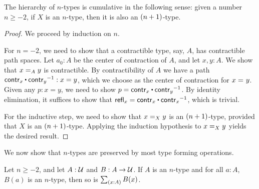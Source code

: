 \begin{thm}\label{thm:hlevel-cumulative}
 The hierarchy of $n$-types is cumulative in the following sense:
   given a number $n \geq -2$, if $X$ is an $n$-type, then it is also an $\nplusone$-type.
\end{thm}

\begin{proof}
 We proceed by induction on $n$.

 For $n = -2$, we need to show that a contractible type, say, $A$, has contractible path spaces.
       Let $a_0: A$ be the center of contraction of $A$, and let $x, y : A$. We show that $\id[A]{x}{y}$
       is contractible.
       By contractibility of $A$ we have a path $\contr_x \ct \opp{\contr_y} : x = y$, which we choose as
       the center of contraction for $\id{x}{y}$.
       Given any $p : x = y$, we need to show $p = \contr_x \ct \opp{\contr_y}$.
           By identity elimination, it suffices to show that
        $\refl{x} = \contr_x \ct \opp{\contr_x}$, which is trivial.

 For the inductive step, we need to show that $\id[X]{x}{y}$ is an $\nplusone$-type, provided
          that $X$ is an $\nplusone$-type. Applying the induction hypothesis to $\id[X]{x}{y}$
         yields the desired result.
\end{proof}


We now show that $n$-types are preserved by most type forming operations.

\begin{thm}\label{thm:ntypes-sigma}
 Let $n \geq -2$, and let $A : \type$ and $B : A \to \type$.
 If $A$ is an $n$-type and for all $a : A$, $B(a)$ is an $n$-type, then so is $\sm{x : A} B(x)$.
\end{thm}

